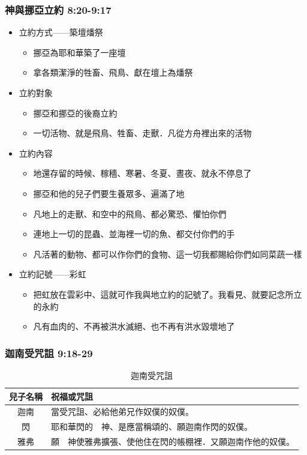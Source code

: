 \subsubsection{神與挪亞立約 8:20-9:17}
\begin{itemize} 
\itemsep-.35em 
\item 立約方式——築壇燔祭
\begin{itemize} 
\itemsep-.35em 
\item 挪亞為耶和華築了一座壇
\item 拿各類潔淨的牲畜、飛鳥、獻在壇上為燔祭
\end{itemize}
\item 立約對象
\begin{itemize} 
\itemsep-.35em 
\item 挪亞和挪亞的後裔立約 
\item 一切活物、就是飛鳥、牲畜、走獸．凡從方舟裡出來的活物 
\end{itemize}
\item 立約內容 
\begin{itemize} 
\itemsep-.35em 
\item 地還存留的時候、稼穡、寒暑、冬夏、晝夜、就永不停息了 
\item 挪亞和他的兒子們要生養眾多、遍滿了地 
\item 凡地上的走獸、和空中的飛鳥、都必驚恐、懼怕你們 
\item 連地上一切的昆蟲、並海裡一切的魚、都交付你們的手 
\item 凡活著的動物、都可以作你們的食物、這一切我都賜給你們如同菜蔬一樣 
\end{itemize}
\item 立約記號——彩虹
\begin{itemize} 
\itemsep-.35em 
\item 把虹放在雲彩中、這就可作我與地立約的記號了。我看見、就要記念所立的永約 
\item 凡有血肉的、不再被洪水滅絕、也不再有洪水毀壞地了 
\end{itemize}
\end{itemize}

\subsubsection{迦南受咒詛 9:18-29}
\begin{table}[H]
\centering
\begin{tabular}{c|l   }
\hline
\hline
兒子名稱   &     祝福或咒詛                 \\\hline
迦南    & 當受咒詛、必給他弟兄作奴僕的奴僕。 \\\hline
 閃          & 耶和華閃的　神、是應當稱頌的、願迦南作閃的奴僕。\\\hline
雅弗   &願　神使雅弗擴張、使他住在閃的帳棚裡．又願迦南作他的奴僕。\\\hline
\end{tabular}
\caption{迦南受咒詛}
\label{table:jianashouzu}
\end{table}

